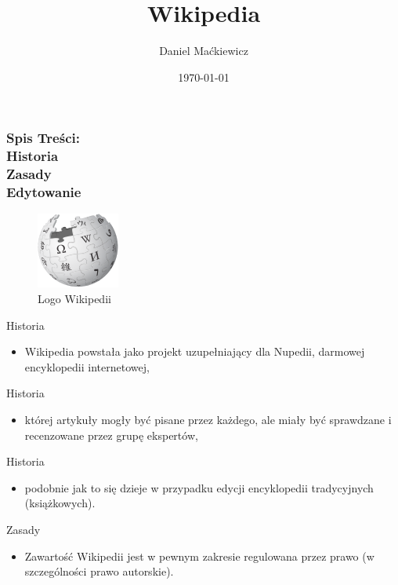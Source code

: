 \documentclass{beamer}
\title{Wikipedia}
\author{Daniel Maćkiewicz}
\date{\today}
\begin{document}
\frame{\titlepage}
\begin{frame} 

\frametitle{Spis Treści: \\ Historia \\ Zasady \\ Edytowanie } 
\tableofcontents

\begin{figure} \includegraphics[width=0.25\hsize]{Wikipedia.png} \caption{Logo Wikipedii}\label{fig:wiki} \end{figure}

\end{frame}




 \begin{frame}{Historia} \begin{itemize} \item Wikipedia powstała jako projekt uzupełniający dla Nupedii, darmowej encyklopedii internetowej, 
 
 \end{itemize} \end{frame}

 \begin{frame}{Historia} \begin{itemize}
 
 \item której artykuły mogły być pisane przez każdego, ale miały być sprawdzane i recenzowane przez grupę ekspertów,
 
 \end{itemize} \end{frame}
 
\begin{frame}{Historia} 
\begin{itemize}
 
 \item podobnie jak to się dzieje w przypadku edycji encyklopedii tradycyjnych (książkowych).
 

 
 \end{itemize} \end{frame}


\begin{frame}{Zasady} \begin{itemize} \item Zawartość Wikipedii jest w pewnym zakresie regulowana przez prawo (w szczególności prawo autorskie). 
 
 \end{itemize} \end{frame}
 
\end{document}

